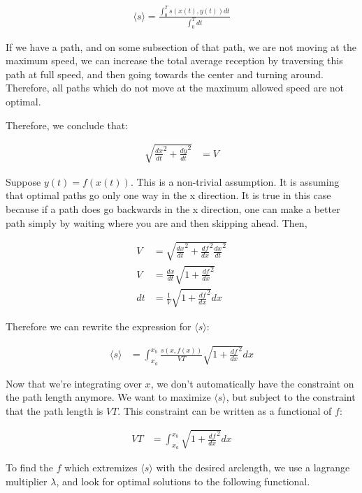 \documentclass{article}
\begin{document}
\begin{align}
\langle s \rangle = \frac{\int_0^T s(x(t),y(t)) dt}{\int_0^T dt} 
	\label{eq:avg-reception}
\end{align}

If we have a path, and on some subsection of that path, we are not moving at
	the maximum speed, we can increase the total average reception
	by traversing this path at full speed, and then going towards the center
	and turning around.
Therefore, all paths which do not move at the maximum allowed speed are not 
	optimal.

Therefore, we conclude that:

\begin{align}
\sqrt{\frac{dx}{dt}^2 + \frac{dy}{dt}^2} & = V
\end{align}

Suppose $y(t) = f(x(t))$.
This is a non-trivial assumption.
It is assuming that optimal paths go only one way in the x direction.
It is true in this case because if a path does go backwards in the
	x direction, one can make a better path simply by waiting where you 
	are and then skipping ahead.
Then,

\begin{align}
V & = \sqrt{\frac{dx}{dt}^2 + \frac{df}{dx}^2\frac{dx}{dt}^2}  \nonumber \\
V & = \frac{dx}{dt} \sqrt{ 1 + \frac{df}{dx}^2}  \nonumber \\
dt & = \frac{1}{V} \sqrt{1 + \frac{df}{dx}^2} dx \label{eq:dt-to-dx}
\end{align}

Therefore we can rewrite the expression for $\langle s \rangle$:

\begin{align}
\langle s \rangle & = \int_{x_a}^{x_b} 
	\frac{s(x,f(x))}{VT} \sqrt{1 + \frac{df}{dx}^2} dx \label{eq:path-integral}
\end{align}

Now that we're integrating over $x$, we don't automatically have the constraint
	on the path length anymore.
We want to maximize $\langle s \rangle$, but subject to the constraint that the
	path length is $V T$.
This constraint can be written as a functional of $f$:

\begin{align}
V T & = \int_{x_a}^{x_b} \sqrt{1 + \frac{df}{dx}^2} dx \label{eq:constraint-on-lambda}
\end{align}

To find the $f$ which extremizes $\langle s \rangle$ with the desired arclength,
	we use a lagrange multiplier $\lambda$, and look for optimal solutions
	to the following functional.
\end{document}
